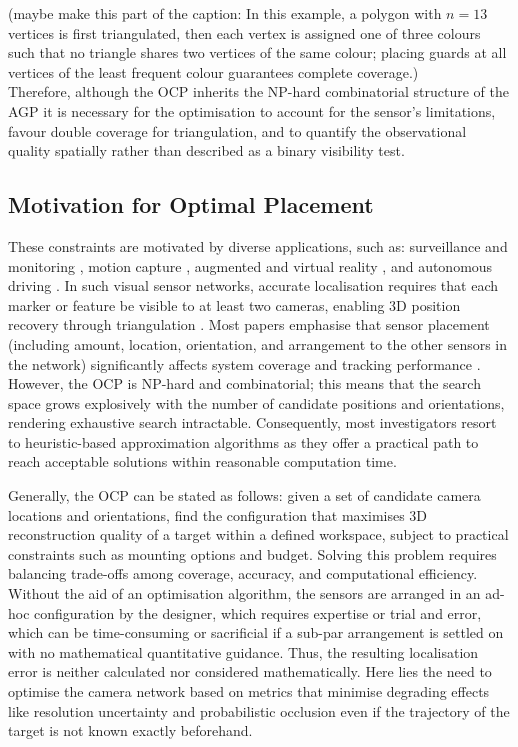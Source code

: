 (maybe make this part of the caption: In this example, a polygon with $n=13$ vertices is first triangulated, then each vertex is assigned one of three colours such that no triangle shares two vertices of the same colour; placing guards at all vertices of the least frequent colour guarantees complete coverage.)
\\
Therefore, although the \gls{OCP} inherits the NP-hard combinatorial structure of the \gls{AGP} it is necessary for the optimisation to account for the sensor's limitations, favour double coverage for triangulation, and to quantify the observational quality spatially rather than described as a binary visibility test.  

\subsection{Motivation for Optimal Placement}
These constraints are motivated by diverse applications, such as: surveillance and monitoring \parencite{bodorOptimalCameraPlacement2007}, motion capture \parencite{aissaouiDesigningCameraPlacement2018, zieglerOptimalCameraPlacement2023}, augmented and virtual reality \parencite{rahimianOptimalCameraPlacement2017}, and autonomous driving \parencite{puligandlaMultiresolutionApproachLarge2022}. In such visual sensor networks, accurate localisation requires that each marker or feature be visible to at least two cameras, enabling 3D position recovery through triangulation \parencite{aissaouiDesigningCameraPlacement2018,zieglerOptimalCameraPlacement2023}. Most papers emphasise that sensor placement (including amount, location, orientation, and arrangement to the other sensors in the network) significantly affects system coverage and tracking performance \parencite{zhouSensorPlacementOptimization2024}. However, the OCP is NP-hard and combinatorial; this means that the search space grows explosively with the number of candidate positions and orientations, rendering exhaustive search intractable. Consequently, most investigators resort to heuristic-based approximation algorithms as they offer a practical path to reach acceptable solutions within reasonable computation time.

Generally, the OCP can be stated as follows: given a set of candidate camera locations and orientations, find the configuration that maximises 3D reconstruction quality of a target within a defined workspace, subject to practical constraints such as mounting options and budget. Solving this problem requires balancing trade-offs among coverage, accuracy, and computational efficiency. Without the aid of an optimisation algorithm, the sensors are arranged in an ad-hoc configuration by the designer, which requires expertise or trial and error, which can be time-consuming or sacrificial if a sub-par arrangement is settled on with no mathematical  quantitative guidance. Thus, the resulting localisation error is neither calculated nor considered mathematically. Here lies the need to optimise the camera network based on metrics that minimise degrading effects like resolution uncertainty and probabilistic occlusion even if the trajectory of the target is not known exactly beforehand.


